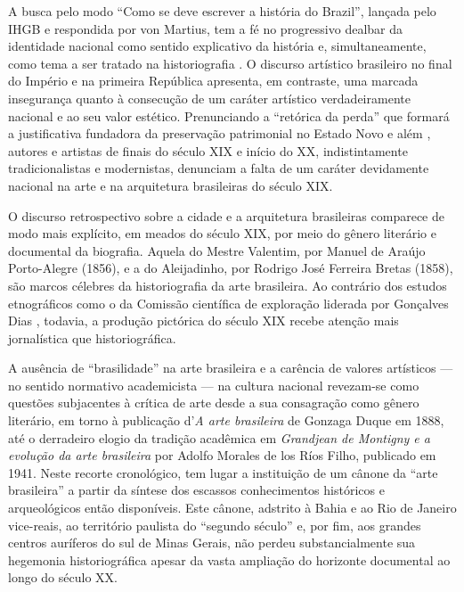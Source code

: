 A busca pelo modo ``Como se deve escrever a história do Brazil'',
lançada pelo IHGB e respondida por von Martius, tem a fé no progressivo
dealbar da identidade nacional como sentido explicativo da história e,
simultaneamente, como tema a ser tratado na historiografia
\autocite[p.~402]{martius:1845se6}. O discurso artístico brasileiro no
final do Império e na primeira República apresenta, em contraste, uma
marcada insegurança quanto à consecução de um caráter artístico
verdadeiramente nacional e ao seu valor estético. Prenunciando a
``retórica da perda'' que formará a justificativa fundadora da
preservação patrimonial no Estado Novo e além
\autocite[p.~90]{goncalves:1996retorica}, autores e artistas de finais
do século XIX e início do XX, indistintamente tradicionalistas e
modernistas, denunciam a falta de um caráter devidamente nacional na
arte e na arquitetura brasileiras do século XIX.

O discurso retrospectivo sobre a cidade e a arquitetura brasileiras
comparece de modo mais explícito, em meados do século XIX, por meio do
gênero literário e documental da biografia. Aquela do Mestre Valentim,
por Manuel de Araújo Porto-Alegre (1856), e a do Aleijadinho, por
Rodrigo José Ferreira Bretas (1858), são marcos célebres da
historiografia da arte brasileira. Ao contrário dos estudos etnográficos
como o da Comissão científica de exploração liderada por Gonçalves Dias
\autocite{kury:2001comissao}, todavia, a produção pictórica do século
XIX recebe atenção mais jornalística que historiográfica.

A ausência de ``brasilidade'' na arte brasileira e a carência de valores
artísticos --- no sentido normativo academicista --- na cultura nacional
revezam-se como questões subjacentes à crítica de arte desde a sua
consagração como gênero literário, em torno à publicação d'\emph{A arte
brasileira} de Gonzaga Duque em 1888, até o derradeiro elogio da
tradição acadêmica em \emph{Grandjean de Montigny e a evolução da arte
brasileira} por Adolfo Morales de los Ríos Filho, publicado em 1941.
Neste recorte cronológico, tem lugar a instituição de um cânone da
``arte brasileira'' a partir da síntese dos escassos conhecimentos
históricos e arqueológicos então disponíveis. Este cânone, adstrito à
Bahia e ao Rio de Janeiro vice-reais, ao território paulista do
``segundo século'' e, por fim, aos grandes centros auríferos do sul de
Minas Gerais, não perdeu substancialmente sua hegemonia historiográfica
apesar da vasta ampliação do horizonte documental ao longo do século XX.

